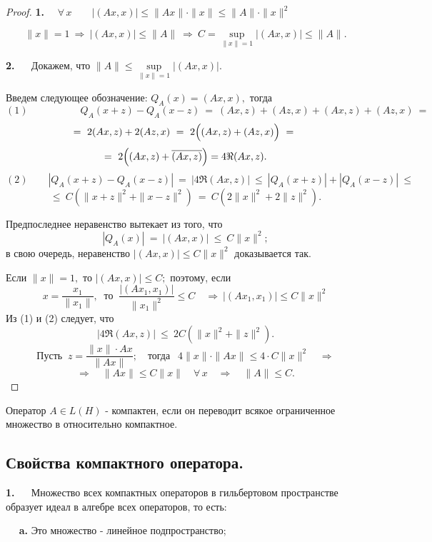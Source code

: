 \documentclass[a4paper]{article}
\newcommand{\sxpo}{\sup\limits_{\|x\| = 1}}
\begin{document}
\begin{proof}
\textbf{1.} $\quad \forall\, x \qquad |(Ax, x)| \leqslant \|Ax\|
\cdot \|x\| \leqslant \|A\|\cdot  \|x\|^2$

$$\|x\| = 1 \ \Longrightarrow \ |(Ax, x)| \leqslant \|A\|\
\Longrightarrow\ C = \sxpo |(Ax, x)| \leqslant \|A\|.
$$

\textbf{2.} $\quad$ Докажем, что $\|A\| \leqslant \sxpo |(Ax,
x)|.$

Введем следующее обозначение: $Q_{A} (x) = (Ax, x),$ тогда
$$
(1)\qquad\qquad\quad\  Q_{A} (x+z) - Q_{A} (x-z)\ = \ (Ax, z) +
(Az, x) + (Ax, z) + (Az, x)\ =
$$
$$
= \ 2(Ax, z) + 2(Az, x)\ = \ 2 \Bigl((Ax, z) + (Az, x)\Bigr)\ = \
$$
$$
= \ 2 \Bigl((Ax, z) + \overline{(Ax, z)}\Bigr) = 4 \Re (Ax, z).
$$
$$
(2)\qquad |Q_{A} (x+z) - Q_{A} (x-z)| \ = \ |4 \Re (Ax, z)| \
\leqslant \ |Q_{A} (x+z)| + |Q_{A} (x-z)|\ \leqslant
$$
$$
\leqslant\ C(\|x+z\|^2 + \|x-z\|^2)\ = \ C(2 \|x\|^2 + 2 \|z\|^2).
$$

Предпоследнее неравенство вытекает из того, что
$$
|Q_A (x)| \ = \ |(Ax, x)| \  \leqslant \  C \|x\|^2;
$$
в свою очередь, неравенство $|(Ax, x)| \leqslant C \|x\|^2$
доказывается так.

Если $\|x\| = 1,$ то $|(Ax, x)|\leqslant C;$ поэтому, если
$$
x = \frac{x_1}{\|x_1\|}, \ \mbox{ то } \ \frac{|(Ax_1,
x_1)|}{\|x_1\|^2} \leqslant C \quad \Rightarrow \ |(Ax_1, x_1)|
\leqslant C \|x\|^2
$$
Из (1) и (2) следует, что
$$
|4 \Re (Ax, z)| \ \leqslant \ 2C(\|x\|^2 + \|z\|^2).
$$
$$
\mbox{Пусть }\ z = \frac{\|x\| \cdot Ax}{\|Ax\|}; \quad \mbox{
тогда }\ \  4 \|x\| \cdot \|Ax\| \leqslant 4\cdot C \|x\|^2\quad
\Longrightarrow
$$
$$
\Longrightarrow\quad \|Ax\| \leqslant C \|x\| \quad \forall\,
x\quad \Longrightarrow \quad \|A\|\leqslant C.
$$
\end{proof}

\begin{df}
Оператор $A\in L(H)$ - компактен, если он переводит всякое
ограниченное множество в относительно компактное.
\end{df}

\subsection{Свойства компактного оператора.}

\textbf{1.} $\quad$ Множество всех компактных операторов в
гильбертовом пространстве образует идеал в алгебре всех
операторов, то есть:

$\quad$ \textbf{a.} Это множество - линейное подпространство;
\end{document}

